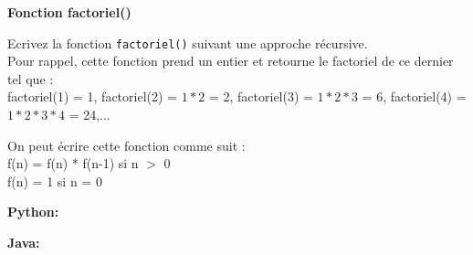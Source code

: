     \begin{Exercice}[10 minutes] \textbf{Fonction factoriel()} 
	
        Ecrivez la fonction \lstinline{factoriel()} suivant une approche récursive. \\ 
        
        Pour rappel, cette fonction prend un entier et retourne le factoriel de ce dernier tel que : \\
        
        factoriel(1) = 1, factoriel(2) = $1*2$ = 2, factoriel(3) = $1*2*3$ = 6, factoriel(4) = $1*2*3*4$ = 24,...
          
        
            \begin{conseil} 
            On peut écrire cette fonction comme suit : \\
            
            f(n) = f(n) * f(n-1) si n $>$ 0 \\
            
            f(n) = 1 si n = 0
            
            \end{conseil} 
        
            \begin{solution} 
                \textbf{Python:}
                
                \textbf{Java:}
                
            \end{solution} 
        
        \end{Exercice}
    
